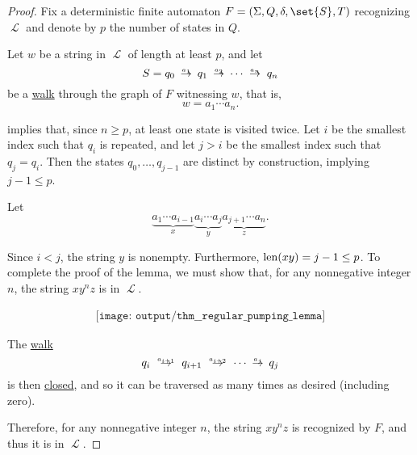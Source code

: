 \begin{proof}
  Fix a deterministic finite automaton \( F = (\Sigma, Q, \delta, \set{ S }, T) \) recognizing \( \mscrL \) and denote by \( p \) the number of states in \( Q \).

  Let \( w \) be a string in \( \mscrL \) of length at least \( p \), and let
  \begin{equation*}
    S = q_0 \reloset {a_1} \to q_1 \reloset {a_2} \to \cdots \reloset {a_n} \to q_n
  \end{equation*}
  be a \hyperref[def:graph_walk/directed]{walk} through the graph of \( F \) witnessing \( w \), that is,
  \begin{equation*}
    w = a_1 \cdots a_n.
  \end{equation*}

   implies that, since \( n \geq p \), at least one state is visited twice. Let \( i \) be the smallest index such that \( q_i \) is repeated, and let \( j > i \) be the smallest index such that \( q_j = q_i \). Then the states \( q_0, \ldots, q_{j-1} \) are distinct by construction, implying \( j - 1 \leq p \).

  Let
  \begin{equation*}
    \underbrace{a_1 \cdots a_{i-1}}_x \underbrace{a_i \cdots a_j}_y \underbrace{a_{j+1} \cdots a_n}_z.
  \end{equation*}

  Since \( i < j \), the string \( y \) is nonempty. Furthermore, \( \operatorname{len}(xy) = j - 1 \leq p \). To complete the proof of the lemma, we must show that, for any nonnegative integer \( n \), the string \( xy^nz \) is in \( \mscrL \).

  \begin{equation*}
    \begin{aligned}
      \texttt{[image: output/thm\_\_regular\_pumping\_lemma]}
    \end{aligned}
  \end{equation*}

  The \hyperref[def:graph_walk]{walk}
  \begin{equation*}
    q_i \reloset {a_{i+1}} \to q_{i+1} \reloset {a_{i+2}} \to \cdots \reloset {a_j} \to q_j
  \end{equation*}
  is then \hyperref[def:graph_walk/closed]{closed}, and so it can be traversed as many times as desired (including zero).

  Therefore, for any nonnegative integer \( n \), the string \( xy^nz \) is recognized by \( F \), and thus it is in \( \mscrL \).
\end{proof}

